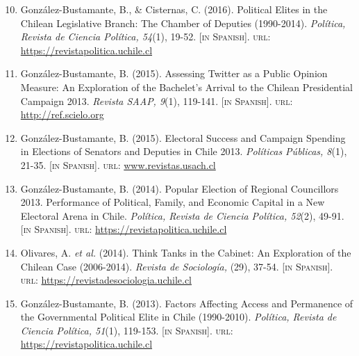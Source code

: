 \documentclass[letterpaper,margin]{res}
\newenvironment{benumerate}[1]{
    \let\oldItem\item
    \def\item{\addtocounter{enumi}{-2}\oldItem}
    \begin{enumerate}
    \setcounter{enumi}{#1}
    \addtocounter{enumi}{1}
}{
    \end{enumerate}
}
\begin{document}
\begin{resume}
\begin{benumerate}{9}
\item{\small Gonz\'alez-Bustamante, B., \& Cisternas, C. (2016). Political Elites in the Chilean Legislative Branch: The Chamber of Deputies (1990-2014). {\itshape Pol\'itica, Revista de Ciencia Pol\'itica, 54}(1), 19-52. {\footnotesize \scshape [in Spanish]}. {\scshape url}: \href{https://revistapolitica.uchile.cl/index.php/RP/article/view/42691}{https://revistapolitica.uchile.cl}}\vspace{1mm}

\item{\small Gonz\'alez-Bustamante, B. (2015). Assessing Twitter as a Public Opinion Measure: An Exploration of the Bachelet's Arrival to the Chilean Presidential Campaign 2013. {\itshape Revista SAAP, 9}(1), 119-141. {\footnotesize \scshape [in Spanish]}. {\scshape url}: \href{http://ref.scielo.org/dwzhns}{http://ref.scielo.org}}\vspace{1mm}

\item{\small Gonz\'alez-Bustamante, B. (2015). Electoral Success and Campaign Spending in Elections of Senators and Deputies in Chile 2013. {\itshape Pol\'iticas P\'ublicas, 8}(1), 21-35. {\footnotesize \scshape [in Spanish]}. {\scshape url}: \href{http://www.revistas.usach.cl/ojs/index.php/politicas/article/view/2182}{www.revistas.usach.cl}}\vspace{1mm}

\item{\small Gonz\'alez-Bustamante, B. (2014). Popular Election of Regional Councillors 2013. Performance of Political, Family, and Economic Capital in a New Electoral Arena in Chile. {\itshape Pol\'itica, Revista de Ciencia Pol\'itica, 52}(2), 49-91. {\footnotesize \scshape [in Spanish]}. {\scshape url}: \href{https://revistapolitica.uchile.cl/index.php/RP/article/view/36137}{https://revistapolitica.uchile.cl}}\vspace{1mm}

\item{\small Olivares, A. {\itshape et al.} (2014). Think Tanks in the Cabinet: An Exploration of the Chilean Case (2006-2014). {\itshape Revista de Sociolog\'ia,} (29), 37-54. {\footnotesize \scshape [in Spanish]}. \\ {\scshape url}: \href{https://revistadesociologia.uchile.cl/index.php/RDS/article/view/36177}{https://revistadesociologia.uchile.cl}}\vspace{1mm}

\item{\small Gonz\'alez-Bustamante, B. (2013). Factors Affecting Access and Permanence of the Governmental Political Elite in Chile (1990-2010). {\itshape Pol\'itica, Revista de Ciencia Pol\'itica, 51}(1), 119-153. {\footnotesize \scshape [in Spanish]}. {\scshape url}: \href{https://revistapolitica.uchile.cl/index.php/RP/article/view/27436}{https://revistapolitica.uchile.cl}}\vspace{1mm}


\end{benumerate}
\end{resume}
\end{document}
